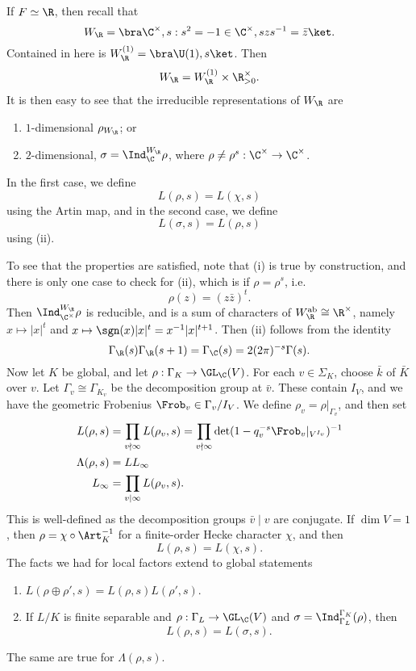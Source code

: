 \documentclass[a4paper]{article}
\newcommand\ab{\mathrm{ab}}
\begin{document}
If $F \simeq \R$, then recall that
\[
  W_\R = \bra \C^\times, s : s^2 = -1 \in \C^\times, szs^{-1} = \bar{z}\ket.
\]
Contained in here is $W_\R^{(1)} = \bra \U(1), s\ket$. Then
\[
  W_\R = W_\R^{(1)} \times \R_{>0}^\times.
\]
It is then easy to see that the irreducible representations of $W_\R$ are
\begin{enumerate}
  \item $1$-dimensional $\rho_{W_\R}$; or
  \item $2$-dimensional, $\sigma = \Ind_\C^{W_\R} \rho$, where $\rho \not= \rho^s: \C^\times \to \C^\times$.
\end{enumerate}
In the first case, we define
\[
  L(\rho, s) = L(\chi, s)
\]
using the Artin map, and in the second case, we define
\[
  L(\sigma, s) = L(\rho, s)
\]
using (ii).

To see that the properties are satisfied, note that (i) is true by construction, and there is only one case to check for (ii), which is if $\rho = \rho^s$, i.e.
\[
  \rho(z) = (z\bar{z})^t.
\]
Then $\Ind_{\C^\times}^{W_\R} \rho$ is reducible, and is a sum of characters of $W_\R^{\ab} \cong \R^\times$, namely $x \mapsto |x|^t$ and $x \mapsto \sgn(x) |x|^t = x^{-1}|x|^{t + 1}$. Then (ii) follows from the identity
\[
  \Gamma_\R(s) \Gamma_\R(s + 1) = \Gamma_\C(s) = 2 (2\pi)^{-s} \Gamma(s).
\]
Now let $K$ be global, and let $\rho: \Gamma_K \to \GL_\C(V)$. For each $v \in \Sigma_K$, choose $\bar{k}$ of $\bar{K}$ over $v$. Let $\Gamma_v \cong \Gamma_{K_v}$ be the decomposition group at $\bar{v}$. These contain $I_V$, and we have the geometric Frobenius $\Frob_v \in \Gamma_v/I_V$. We define $\rho_v = \rho|_{\Gamma_v}$, and then set
\begin{align*}
  L(\rho, s) &= \prod_{v \nmid \infty} L(\rho_v, s) =\prod_{v \nmid \infty} \det (1 - q_v^{-s} \Frob_v|_{V^{I_v}})^{-1}\\
  \Lambda(\rho, s) &= L L_\infty\\
  L_\infty &= \prod_{v \mid \infty} L(\rho_v, s).
\end{align*}
This is well-defined as the decomposition groups $\bar{v} \mid v $ are conjugate. If $\dim V = 1$, then $\rho = \chi \circ \Art_K^{-1}$ for a finite-order Hecke character $\chi$, and then
\[
  L(\rho, s) = L(\chi, s).
\]
The facts we had for local factors extend to global statements
\begin{prop}\leavevmode
  \begin{enumerate}
    \item $L(\rho \oplus \rho', s) = L(\rho, s) L(\rho', s)$.
    \item If $L/K$ is finite separable and $\rho: \Gamma_L \to \GL_\C(V)$ and $\sigma = \Ind_{\Gamma_L}^{\Gamma_K}(\rho)$, then
      \[
        L(\rho, s) = L(\sigma, s).
      \]
  \end{enumerate}
  The same are true for $\Lambda(\rho, s)$.
\end{prop}
\end{document}
